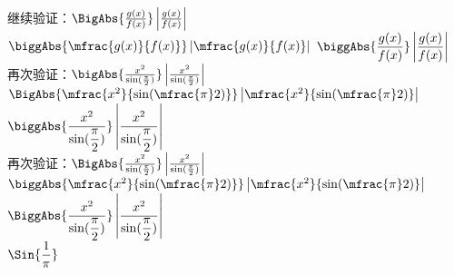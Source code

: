 继续验证：$\BigAbs{\frac{g(x)}{f(x)}}  \left| \frac{g(x)}{f(x)} \right| $
        $\biggAbs{\mfrac{g(x)}{f(x)}} \left| \mfrac{g(x)}{f(x)} \right| $
        $\biggAbs{\dfrac{g(x)}{f(x)}} \left| \dfrac{g(x)}{f(x)} \right|$\\
再次验证：$\bigAbs{\frac{x^2}{\sin(\frac{\pi}2)}}  \left| \frac{x^2}{\sin(\frac{\pi}2)} \right| $
        $\BigAbs{\mfrac{x^2}{\sin(\mfrac{\pi}2)}} \left| \mfrac{x^2}{\sin(\mfrac{\pi}2)} \right| $
        $\biggAbs{\dfrac{x^2}{\sin(\dfrac{\pi}2)}} \left| \dfrac{x^2}{\sin(\dfrac{\pi}2)} \right|$\\
再次验证：$\BigAbs{\frac{x^2}{\sin(\frac{\pi}2)}}  \left| \frac{x^2}{\sin(\frac{\pi}2)} \right| $
        $\biggAbs{\mfrac{x^2}{\sin(\mfrac{\pi}2)}} \left| \mfrac{x^2}{\sin(\mfrac{\pi}2)} \right| $
        $\BiggAbs{\dfrac{x^2}{\sin(\dfrac{\pi}2)}} \left| \dfrac{x^2}{\sin(\dfrac{\pi}2)} \right|$\\
$\Sin{\dfrac{1}{\pi}}$









